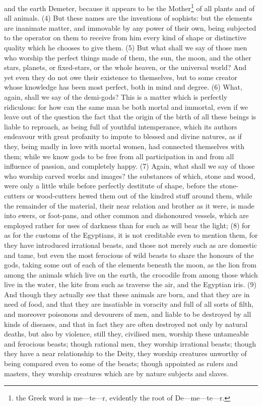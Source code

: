 and the earth Demeter, because it appears to be the Mother\footnote{the Greek word is me—te—r, evidently the
root of De—me—te—r.} of all plants and of all animals. (4) But these names are the inventions of
sophists: but the elements are inanimate matter, and immovable by any power of their own, being
subjected to the operator on them to receive from him every kind of shape or distinctive quality
which he chooses to give them. (5) But what shall we say of those men who worship the perfect
things made of them, the sun, the moon, and the other stars, planets, or fixed-stars, or the whole
heaven, or the universal world? And yet even they do not owe their existence to themselves, but to
some creator whose knowledge has been most perfect, both in mind and degree. (6) What, again,
shall we say of the demi-gods? This is a matter which is perfectly ridiculous: for how can the same
man be both mortal and immortal, even if we leave out of the question the fact that the origin of the
birth of all these beings is liable to reproach, as being full of youthful intemperance, which its
authors endeavour with great profanity to impute to blessed and divine natures, as if they, being
madly in love with mortal women, had connected themselves with them; while we know gods to be
free from all participation in and from all influence of passion, and completely happy. (7) Again,
what shall we say of those who worship carved works and images? the substances of which, stone
and wood, were only a little while before perfectly destitute of shape, before the stone-cutters or
wood-cutters hewed them out of the kindred stuff around them, while the remainder of the material,
their near relation and brother as it were, is made into ewers, or foot-pans, and other common and
dishonoured vessels, which are employed rather for uses of darkness than for such as will bear
the light; (8) for as for the customs of the Egyptians, it is not creditable even to mention them, for
they have introduced irrational beasts, and those not merely such as are domestic and tame, but
even the most ferocious of wild beasts to share the honours of the gods, taking some out of each
of the elements beneath the moon, as the lion from among the animals which live on the earth, the
crocodile from among those which live in the water, the kite from such as traverse the air, and the
Egyptian iris. (9) And though they actually see that these animals are born, and that they are in
need of food, and that they are insatiable in voracity and full of all sorts of filth, and moreover
poisonous and devourers of men, and liable to be destroyed by all kinds of diseases, and that in
fact they are often destroyed not only by natural deaths, but also by violence, still they, civilised
men, worship these untameable and ferocious beasts; though rational men, they worship irrational
beasts; though they have a near relationship to the Deity, they worship creatures unworthy of being
compared even to some of the beasts; though appointed as rulers and masters, they worship
creatures which are by nature subjects and slaves.

